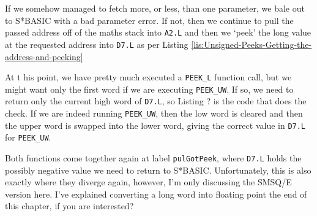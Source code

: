 

If we somehow managed to fetch more, or less, than one parameter,
we bale out to S{*}BASIC with a bad parameter error. If not, then
we continue to pull the passed address off of the maths stack into
\texttt{A2.L} and then we `peek' the long value at the requested
address into \texttt{D7.L} as per Listing \ref{lis:Unsigned-Peeks-Getting-the-address-and-peeking}



At t his point, we have pretty much executed a \texttt{PEEK\_L} function
call, but we might want only the first word if we are executing \texttt{PEEK\_UW}.
If so, we need to return only the current high word of \texttt{D7.L},
so Listing ? is the code that does the check. If we are indeed running
\texttt{PEEK\_UW}, then the low word is cleared and then the upper
word is swapped into the lower word, giving the correct value in \texttt{D7.L}
for \texttt{PEEK\_UW}.



Both functions come together again at label \texttt{pulGotPeek}, where
\texttt{D7.L} holds the possibly negative value we need to return
to S{*}BASIC. Unfortunately, this is also exactly where they diverge
again, however, I'm only discussing the SMSQ/E version here. I've
explained converting a long word into floating point the end of this
chapter, if you are interested?

